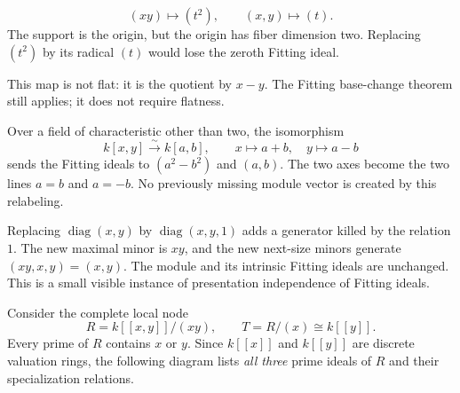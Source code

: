 \begin{minipage}[c]{.44\linewidth}
\end{minipage}\hfill
\begin{minipage}[c]{.51\linewidth}
\[
(xy)\longmapsto(t^2),\qquad
(x,y)\longmapsto(t).
\]
The support is the origin, but the origin has fiber dimension two. Replacing $(t^2)$ by its radical $(t)$ would lose the zeroth Fitting ideal.

This map is not flat: it is the quotient by $x-y$. The Fitting base-change theorem still applies; it does not require flatness.
\end{minipage}

Over a field of characteristic other than two, the isomorphism
\[
k[x,y]\xrightarrow{\sim}k[a,b],\qquad x\mapsto a+b,\quad y\mapsto a-b
\]
sends the Fitting ideals to $(a^2-b^2)$ and $(a,b)$. The two axes become the two lines $a=b$ and $a=-b$. No previously missing module vector is created by this relabeling.

Replacing $\operatorname{diag}(x,y)$ by $\operatorname{diag}(x,y,1)$ adds a generator killed by the relation $1$. The new maximal minor is $xy$, and the new next-size minors generate $(xy,x,y)=(x,y)$. The module and its intrinsic Fitting ideals are unchanged. This is a small visible instance of presentation independence of Fitting ideals.


Consider the complete local node
\[
R=k[[x,y]]/(xy),\qquad T=R/(x)\cong k[[y]].
\]
Every prime of $R$ contains $x$ or $y$. Since $k[[x]]$ and $k[[y]]$ are discrete valuation rings, the following diagram lists \emph{all three} prime ideals of $R$ and their specialization relations.


